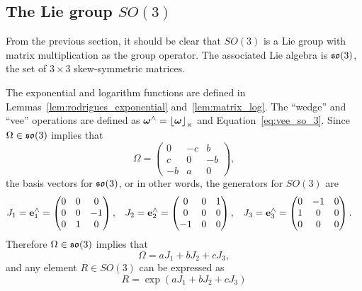 \subsection{The Lie group $SO(3)$}

From the previous section, it should be clear that $SO(3)$ is a Lie group with matrix multiplication as the group operator.  The associated Lie algebra is $\mathfrak{so}(3)$, the set of $3\times 3$ skew-symmetric matrices.

The exponential and logarithm functions are defined in Lemmas~\ref{lem:rodrigues_exponential} and~\ref{lem:matrix_log}.  The ``wedge'' and ``vee'' operations are defined as $\boldsymbol{\omega}^\wedge = \left\lfloor\boldsymbol{\omega}\right\rfloor_{\times}$ and Equation~\eqref{eq:vee_so_3}. Since $\Omega\in\mathfrak{so}(3)$ implies that
\[
\Omega = \begin{pmatrix} 0 & -c & b \\ c & 0 & -b \\ -b & a & 0 \end{pmatrix},
\]
the basis vectors for $\mathfrak{so}(3)$, or in other words, the generators for $SO(3)$ are
\begin{align*}
J_{1} & =\mathbf{e}_{1}^\wedge = \begin{pmatrix}0 & 0 & 0\\
0 & 0 & -1\\
0 & 1 & 0
\end{pmatrix}, & J_{2} &= \mathbf{e}_2^\wedge = \begin{pmatrix}0 & 0 & 1\\
0 & 0 & 0\\
-1 & 0 & 0
\end{pmatrix}, & J_{3} &= \mathbf{e}_3^\wedge = \begin{pmatrix}0 & -1 & 0\\
1 & 0 & 0\\
0 & 0 & 0
\end{pmatrix}.
\end{align*}
Therefore $\Omega\in\mathfrak{so}(3)$ implies that
\[
\Omega = aJ_1 + bJ_2 + cJ_3,
\]
and any element $R\in SO(3)$ can be expressed as
\[
R = \exp\left( aJ_1 + bJ_2 + cJ_3 \right)
\]


